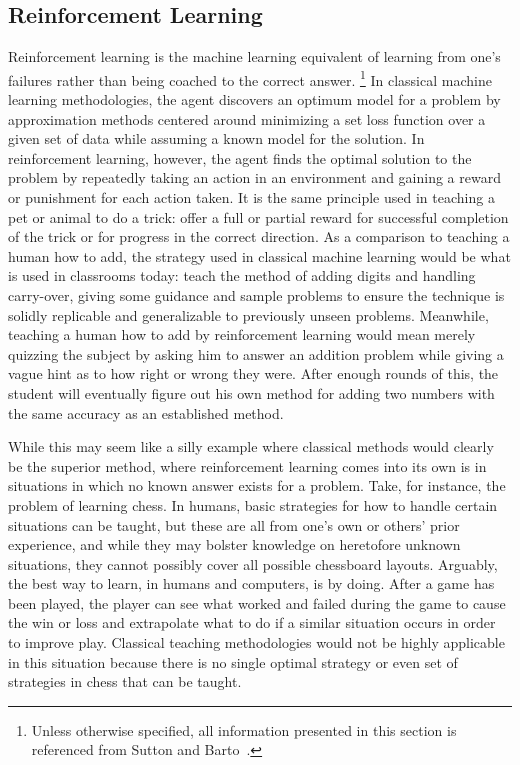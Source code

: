 \subsection{Reinforcement Learning}
\label{sec:intro-reinf}



Reinforcement learning is the machine learning equivalent of learning from one's
failures
rather than being coached to the correct answer.%
\footnote{
	Unless otherwise specified,
	all information presented in this section is referenced from
	Sutton and Barto~\cite{rl_book}.
}
%
In classical machine learning methodologies,
the agent discovers an optimum model for a problem by approximation methods
centered around minimizing a set loss function over a given set of data
while assuming a known model for the solution.
%
In reinforcement learning,
however,
the agent finds the optimal solution to the problem by repeatedly taking an
action in an environment and gaining a reward or punishment for each
action taken.
%
It is the same principle used in teaching a pet or animal to do a trick:
offer a full or partial reward for successful completion of the trick or
for progress in the correct direction.
%
As a comparison to teaching a human how to add,
the strategy used in classical machine learning would be what is used in
classrooms today:
teach the method of adding digits and handling carry-over,
giving some guidance and sample problems to ensure the technique is solidly
replicable and generalizable to previously unseen problems.
%
Meanwhile, teaching a human how to add by reinforcement learning would
mean merely quizzing the subject by asking him to answer an addition problem
while giving a vague hint as to how right or wrong they were.
%
After enough rounds of this,
the student will eventually figure out his own method for adding two numbers
with the same accuracy as an established method.

While this may seem like a silly example where classical methods would clearly
be the superior method,
where reinforcement learning comes into its own is in situations in which no
known answer exists for a problem.
%
Take, for instance, the problem of learning chess.
%
In humans,
basic strategies for how to handle certain situations can be taught,
but these are all from one's own or others' prior experience,
and while they may bolster knowledge on heretofore unknown situations,
they cannot possibly cover all possible chessboard layouts.
%
Arguably, the best way to learn, in humans and computers, is by doing.
%
%
After a game has been played,
the player can see what worked and failed during the game to cause the win or
loss and extrapolate what to do if a similar situation occurs in order to
improve play.
%
Classical teaching methodologies would not be highly applicable in this
situation because there is no single optimal strategy
or even set of strategies
in chess that can be taught.






